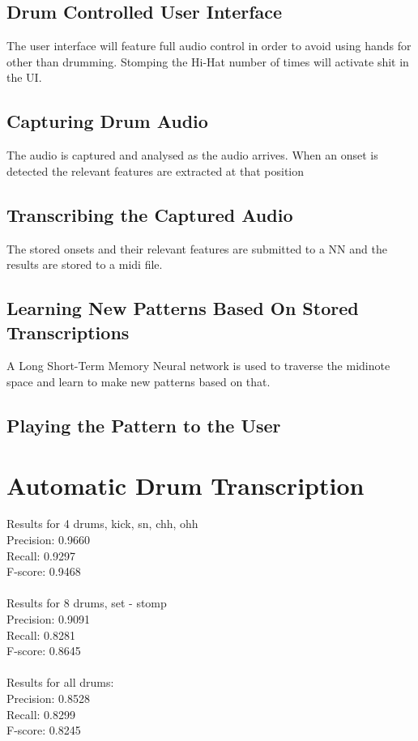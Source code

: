 \documentclass[10pt]{article}
\begin{document}
\subsection{Drum Controlled User Interface}
The user interface will feature full audio control in order to avoid using hands for other than drumming. Stomping the Hi-Hat number of times will activate shit in the UI.
\subsection{Capturing Drum Audio}
The audio is captured and analysed as the audio arrives. When an onset is detected the relevant features are extracted at that position
\subsection{Transcribing the Captured Audio}
The stored onsets and their relevant features are submitted to a NN and the results are stored to a midi file.
\subsection{Learning New Patterns Based On Stored Transcriptions}
A Long Short-Term Memory Neural network is used to traverse the midinote space and learn to make new patterns based on that.
\subsection{Playing the Pattern to the User}
\section{Automatic Drum Transcription}
Results for 4 drums, kick, sn, chh, ohh
\\
Precision: 0.9660\\
Recall: 0.9297\\
F-score: 0.9468\\
\\
Results for 8 drums, set - stomp\\
Precision: 0.9091\\
Recall: 0.8281\\
F-score: 0.8645\\
\\
Results for all drums:\\
Precision: 0.8528\\
Recall: 0.8299\\
F-score: 0.8245\\
\end{document}
